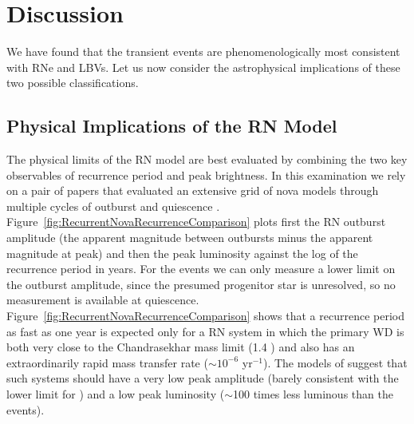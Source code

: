 \section{Discussion}
\label{sec:Discussion}

We have found that the \spock transient events are phenomenologically
most consistent with RNe and LBVs.  Let us now consider
the astrophysical implications of these two possible classifications.

\subsection{Physical Implications of the RN Model}

The physical limits of the RN model are best evaluated by combining
the two key observables of recurrence period and peak brightness. In
this examination we rely on a pair of papers that evaluated an
extensive grid of nova models through multiple cycles of outburst and
quiescence \citep{Prialnik:1995,Yaron:2005}.
Figure~\ref{fig:RecurrentNovaRecurrenceComparison} plots first the RN
outburst amplitude (the apparent magnitude between outbursts minus the
apparent magnitude at peak) and then the peak luminosity against the
log of the recurrence period in years.
For the \spock events we can only measure a lower limit on the
outburst amplitude, since the presumed progenitor star is unresolved,
so no measurement is available at
quiescence. Figure~\ref{fig:RecurrentNovaRecurrenceComparison} shows
that a recurrence period as fast as one year is expected only for a RN
system in which the primary WD is both very close to the Chandrasekhar
mass limit (1.4 \Msun) and also has an extraordinarily rapid mass
transfer rate ($\sim10^{-6}$ \Msun yr$^{-1}$).  The models of
\citet{Yaron:2005} suggest that such systems should have a very low
peak amplitude (barely consistent with the lower limit for \spock) and
a low peak luminosity ($\sim$100 times less luminous than the \spock
events).


